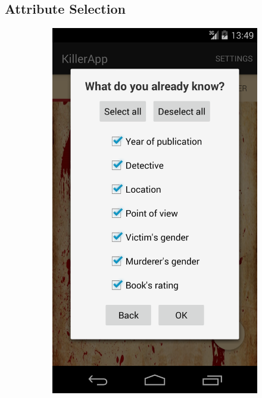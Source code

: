 \documentclass{mproj}
\begin{document}
\subsection*{Attribute Selection}\label{attributes}

\begin{figure}[h]
	\centering
	\begin{subfigure}{0.25\textwidth}
		\includegraphics[width=\textwidth]{images/attributes_dialog}		

\end{subfigure}
\end{figure}
\end{document}
